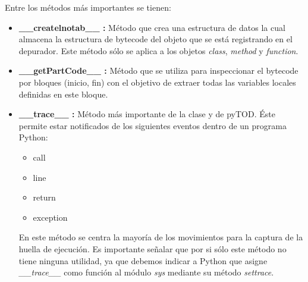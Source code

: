 \documentclass[12pt,legalpaper]{report}
\begin{document}
Entre los métodos más importantes se tienen:
\begin{itemize}
	\item \textbf{\_\_createlnotab\_\_ :} Método que crea una estructura de datos la cual almacena la estructura de bytecode del objeto que se está registrando en el depurador.  Este método sólo se aplica a los objetos \textit{class}, \textit{method} y \textit{function}.

	\item \textbf{\_\_getPartCode\_\_ :} Método que se utiliza para inspeccionar el bytecode por bloques (inicio, fin) con el objetivo de extraer todas las variables locales definidas en este bloque.
	
	\item \textbf{\_\_trace\_\_ :} Método más importante de la clase y de pyTOD.  Éste permite estar notificados de los siguientes eventos dentro de un programa Python:
	\begin{itemize}
		\item call
		\item line
		\item return
		\item exception
	\end{itemize}
En este método se centra la mayoría de los movimientos para la captura de la huella de ejecución.  Es importante señalar que por si sólo este método no tiene ninguna utilidad, ya que debemos indicar a Python que asigne \textit{\_\_trace\_\_} como función al módulo \textit{sys} mediante su método \textit{settrace}.
\end{itemize}
\end{document}
